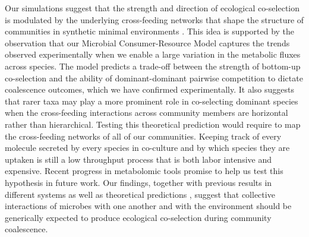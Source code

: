 \documentclass[a4paper,10pt]{article}
\begin{document}
Our simulations suggest that the strength and direction of ecological co-selection is modulated
by the underlying cross-feeding networks that shape the structure of
communities in synthetic minimal environments
\cite{Goldford2018,Estrela2020}.
This idea is supported by the observation that our Microbial Consumer-Resource Model
captures the trends observed experimentally when we enable a large variation
in the metabolic fluxes across species.
The model predicts a trade-off between the strength of bottom-up co-selection
and the ability of dominant-dominant pairwise competition to dictate coalescence outcomes,
which we have confirmed experimentally.
It also suggests that rarer taxa may play a more prominent role in co-selecting
dominant species when the cross-feeding interactions across community members are
horizontal rather than hierarchical.
Testing this theoretical prediction would require to map the cross-feeding networks of all of our communities.
Keeping track of every molecule secreted by every species in co-culture and by which species they are uptaken
is still a low throughput process that is both labor intensive and expensive.
Recent progress in metabolomic tools promise to help us test this hypothesis in future work.
Our findings,
together with previous results in different systems \cite{Sierocinski2017} as well as
theoretical predictions
\cite{Gilpin1994,Toquenaga1997,Tikhonov2016,Tikhonov2017,Vila2019,Lechon2021},
suggest that collective interactions of microbes with one another
and with the environment should be generically expected to produce ecological co-selection
during community coalescence.

\end{document}
